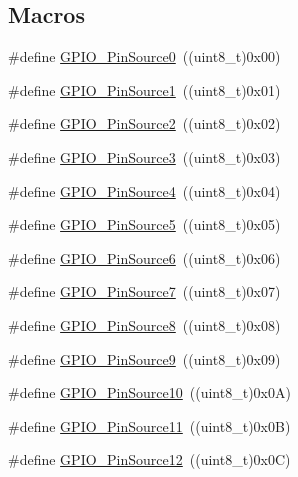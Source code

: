 \subsection*{Macros}
\begin{DoxyCompactItemize}
\item 
\#define \hyperlink{group___g_p_i_o___pin__sources_ga028bcbdf5a7fd81ec45830f60a022bb4}{G\+P\+I\+O\+\_\+\+Pin\+Source0}~((uint8\+\_\+t)0x00)
\item 
\#define \hyperlink{group___g_p_i_o___pin__sources_gad02324cdd8526a7aacd15a5a910d56f1}{G\+P\+I\+O\+\_\+\+Pin\+Source1}~((uint8\+\_\+t)0x01)
\item 
\#define \hyperlink{group___g_p_i_o___pin__sources_ga7808fb6269890fa1e37a322418884607}{G\+P\+I\+O\+\_\+\+Pin\+Source2}~((uint8\+\_\+t)0x02)
\item 
\#define \hyperlink{group___g_p_i_o___pin__sources_ga0df17fee84ec9ab096b5525a06871863}{G\+P\+I\+O\+\_\+\+Pin\+Source3}~((uint8\+\_\+t)0x03)
\item 
\#define \hyperlink{group___g_p_i_o___pin__sources_gaf5aa545455dacbf315a40cecd0842b6c}{G\+P\+I\+O\+\_\+\+Pin\+Source4}~((uint8\+\_\+t)0x04)
\item 
\#define \hyperlink{group___g_p_i_o___pin__sources_gaf231e680fe2db4ea44a7fd0f5d5c5875}{G\+P\+I\+O\+\_\+\+Pin\+Source5}~((uint8\+\_\+t)0x05)
\item 
\#define \hyperlink{group___g_p_i_o___pin__sources_gada41b6bd03b2873a2400628df0a1026e}{G\+P\+I\+O\+\_\+\+Pin\+Source6}~((uint8\+\_\+t)0x06)
\item 
\#define \hyperlink{group___g_p_i_o___pin__sources_ga609974472a3a7c5274fc56018d7adf16}{G\+P\+I\+O\+\_\+\+Pin\+Source7}~((uint8\+\_\+t)0x07)
\item 
\#define \hyperlink{group___g_p_i_o___pin__sources_ga6f5962c5b2ce5734734563bdad18fbd6}{G\+P\+I\+O\+\_\+\+Pin\+Source8}~((uint8\+\_\+t)0x08)
\item 
\#define \hyperlink{group___g_p_i_o___pin__sources_gabaaed5961f2b9862082f74e18f5c3f0e}{G\+P\+I\+O\+\_\+\+Pin\+Source9}~((uint8\+\_\+t)0x09)
\item 
\#define \hyperlink{group___g_p_i_o___pin__sources_gacec97d9c2d319b450f699adff6430c86}{G\+P\+I\+O\+\_\+\+Pin\+Source10}~((uint8\+\_\+t)0x0\+A)
\item 
\#define \hyperlink{group___g_p_i_o___pin__sources_ga446be4a99e84eefb5c71a643211f598b}{G\+P\+I\+O\+\_\+\+Pin\+Source11}~((uint8\+\_\+t)0x0\+B)
\item 
\#define \hyperlink{group___g_p_i_o___pin__sources_gaaa64892c00d50b0fa49f0ce72a83e6e0}{G\+P\+I\+O\+\_\+\+Pin\+Source12}~((uint8\+\_\+t)0x0\+C)

\end{DoxyCompactItemize}
